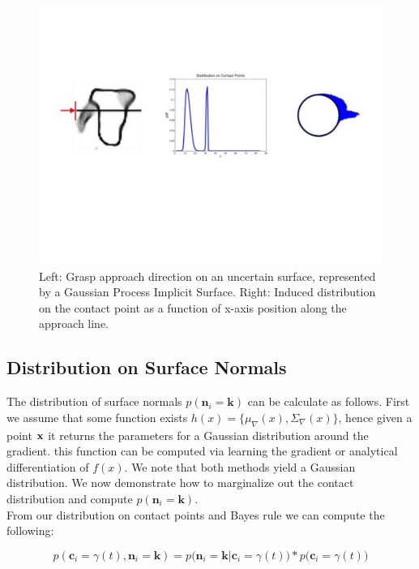 \documentclass[letterpaper, 10 pt, conference]{ieeeconf}  %
\begin{document}
\begin{figure}[ht!]
\centering
\includegraphics[scale = 0.3]{figures/Slide04.jpg}
\caption{Left: Grasp approach direction on an uncertain surface, represented by a Gaussian Process Implicit Surface.  Right: Induced distribution on the contact point as a function of x-axis position along the approach line.}
\vspace*{-10pt}
\label{fig:GraspContactPt}
\end{figure}

\subsection{Distribution on Surface Normals} 
The distribution of surface normals $p(\textbf{n}_i = \textbf{k})$ can be calculate as follows.
First we assume that some function exists $h(x) = \lbrace \mu_{\nabla}(x), \Sigma_{\nabla}(x) \rbrace$, hence given a point $\bf{x}$ it returns the parameters for a Gaussian distribution around the gradient.
this function can be computed via learning the gradient \cite{solak2003derivative} or analytical differentiation of $f(x)$.
We note that both methods yield a Gaussian distribution.
We now demonstrate how to marginalize out the contact distribution and compute $p(\textbf{n}_i = \textbf{k})$.\\

From our distribution on contact points and Bayes rule we can compute the following: 

\begin{equation}
p(\textbf{c}_i = \gamma(t), \textbf{n}_i = \textbf{k}) = p\big(\textbf{n}_i = \textbf{k} | \textbf{c}_i = \gamma(t) \big)*p\big(\textbf{c}_i = \gamma(t)\big)
\end{equation}
\end{document}
